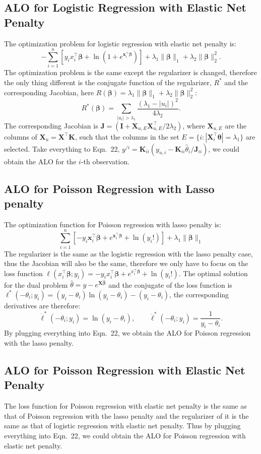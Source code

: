 \documentclass[11pt]{article}
\newcommand{\bx}{\bm{x}}
\newcommand{\bI}{\bm{I}}
\newcommand{\bJ}{\bm{J}}
\newcommand{\bK}{\bm{K}}
\newcommand{\bX}{\bm{X}}
\newcommand{\bbeta}{\bm{\beta}}
\newcommand{\btheta}{\bm{\theta}}
\newcommand{\refthm}[2]{#1~#2}
\begin{document}
\subsection{ALO for Logistic Regression with Elastic Net Penalty}
The optimization problem for logistic regression with elastic net penalty is: \[-\sum_{i=1}^n\left[y_{i}x_{i}^{\top}\bbeta+\ln\left(1+e^{\bx_{i}^{\top}\bbeta}\right)\right]+\lambda_{1}\|\bbeta\|_{1}+\lambda_{2}\|\bbeta\|_{2}^{2}.\]
The optimization problem is the same except the regularizer is changed, therefore the only thing different is the conjugate function of the regularizer, $R^{*}$ and the corresponding Jacobian, here $R(\bbeta) = \lambda_{1}\|\bbeta\|_{1}+\lambda_{2}\|\bbeta\|_{2}^{2}$: \[R^{*}(\bbeta) = \sum\limits_{|u_{i}| > \lambda_{1}} \frac{(\lambda_{1}-|u_{i}|)^{2}}{4\lambda_{2}}.\] The corresponding Jacobian is $\bJ = (\bI +\bX_{u,E}\bX_{u,E}^{\top}/2\lambda_{2})$, where $\bX_{u,E}$ are the columns of $\bX_{u}=\bX^{\top}\bK$, such that the columns in the set $E = \{i:|\bX_{i}^{\top}\btheta| = \lambda_{1}\}$ are selected. Take everything to \refthm{Eqn.}{22}, $y^{/i} = \bK_{ii}(y_{u,i}-\bK_{ii}\hat{\theta}_{i}/\bJ_{ii})$, we could obtain the ALO for the $i$-th observation.

\subsection{ALO for Poisson Regression with Lasso penalty}
The optimization function for Poisson regression with lasso penalty is: \[\sum_{i=1}^n\left[-y_{i}\bx_{i}^{\top}\bbeta+e^{\bx_{i}^{\top}\bbeta}+\ln(y_{i}!)\right] + \lambda_{1}\|\bbeta\|_{1}\] The regularizer is the same as the logistic regression with the lasso penalty case, thus the Jacobian will also be the same, therefore we only have to focus on the loss function $\ell(x_{i}^{\top}\bbeta ; y_{i}) = -y_{i}x_{i}^{\top}\bbeta+e^{x_{i}^{\top}\bbeta}+\ln(y_{i}!)$. The optimal solution for the dual problem $\hat{\theta} = y - e^{\bX\hat{\bbeta}}$ and the conjugate of the loss function is $\ell^{*}(-\theta_{i};y_{i}) = (y_{i}-\theta_{i})\ln(y_{i}-\theta_{i})-(y_{i}-\theta_{i})$, the corresponding derivatives are therefore: \[\dot{\ell}^{*}(-\theta_{i};y_{i}) = \ln(y_{i}-\theta_{i}),\qquad\ddot{\ell}^{*}(-\theta_{i};y_{i}) = \frac{1}{y_{i}-\theta_{i}}.\] By plugging everything into \refthm{Eqn.}{22}, we obtain the ALO for Poisson regression with the lasso penalty.

\subsection{ALO for Poisson Regression with Elastic Net Penalty}
The loss function for Poisson regression with elastic net penalty is the same as that of Poisson regression with the lasso penalty and the regularizer of it is the same as that of logistic regression with elastic net penalty. Thus by plugging everything into \refthm{Eqn.}{22}, we could obtain the ALO for Poisson regression with elastic net penalty.
\end{document}
